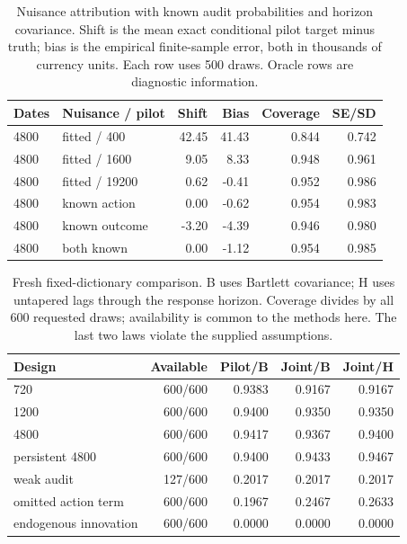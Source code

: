 \begin{table}[htbp]\centering\small
\begin{tabular}{llrrrr}
\toprule
Dates & Nuisance / pilot & Shift & Bias & Coverage & SE/SD\\\midrule
4800 & fitted / 400 & 42.45 & 41.43 & 0.844 & 0.742\\
4800 & fitted / 1600 & 9.05 & 8.33 & 0.948 & 0.961\\
4800 & fitted / 19200 & 0.62 & -0.41 & 0.952 & 0.986\\
4800 & known action & 0.00 & -0.62 & 0.954 & 0.983\\
4800 & known outcome & -3.20 & -4.39 & 0.946 & 0.980\\
4800 & both known & 0.00 & -1.12 & 0.954 & 0.985\\
\bottomrule\end{tabular}
\caption{Nuisance attribution with known audit probabilities and horizon covariance. Shift is the mean exact conditional pilot target minus truth; bias is the empirical finite-sample error, both in thousands of currency units. Each row uses 500 draws. Oracle rows are diagnostic information.}
\label{v9:diagnostic-table}
\end{table}

\begin{table}[htbp]\centering\small
\begin{tabular}{lrrrr}
\toprule
Design & Available & Pilot/B & Joint/B & Joint/H\\\midrule
720 & 600/600 & 0.9383 & 0.9167 & 0.9167\\
1200 & 600/600 & 0.9400 & 0.9350 & 0.9350\\
4800 & 600/600 & 0.9417 & 0.9367 & 0.9400\\
persistent 4800 & 600/600 & 0.9400 & 0.9433 & 0.9467\\
weak audit & 127/600 & 0.2017 & 0.2017 & 0.2017\\
omitted action term & 600/600 & 0.1967 & 0.2467 & 0.2633\\
endogenous innovation & 600/600 & 0.0000 & 0.0000 & 0.0000\\
\bottomrule\end{tabular}
\caption{Fresh fixed-dictionary comparison. B uses Bartlett covariance; H uses untapered lags through the response horizon. Coverage divides by all 600 requested draws; availability is common to the methods here. The last two laws violate the supplied assumptions.}
\label{v9:validation-table}
\end{table}


